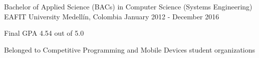 \begin{cventries}
  \cventry
    {Bachelor of Applied Science (BACs) in Computer Science (Systems Engineering)}
    {EAFIT University}
    {Medellín, Colombia}
    {January 2012 - December 2016}
    {
      \begin{cvitems}
        \item {Final GPA 4.54 out of 5.0}
        \item {Belonged to Competitive Programming and Mobile Devices student organizations}
      \end{cvitems}
    }
\end{cventries}
